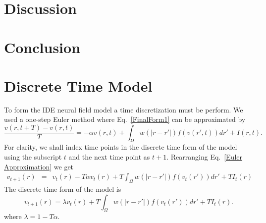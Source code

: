 \documentclass[onecolumn,draftcls]{IEEEtran}
\begin{document}
\section{Discussion}

\section{Conclusion}

\appendices

\section{Discrete Time Model}\label{Time Discretization}
To form the IDE neural field model a time discretization must be perform. We used a one-step Euler method where Eq.~\ref{FinalForm1} can be approximated by
\begin{equation}\label{Euler Approximation}	
\frac{v\left( r,t+T \right) - v\left( r,t\right)}{T} =   -\alpha v\left( r,t \right) + \int_\Omega  {w\left( |r-r'| \right)f\left( {v\left( r',t \right)} \right)dr'} + I\left(r,t\right).
\end{equation}
For clarity, we shall index time points in the discrete time form of the model using the subscript $t$ and the next time point as $t+1$. Rearranging Eq.~\ref{Euler Approximation} we get
\begin{eqnarray}\label{Euler Approximation}	
v_{t+1}\left( r\right) &=& v_t\left( r\right) -T \alpha v_t\left( r\right) + T \int_\Omega  {w\left( |r-r'| \right)f\left( {v_t\left( r'\right)} \right)dr'} + T I_t\left(r\right)
\end{eqnarray}
The discrete time form of the model is
\begin{equation}\label{Discrete Time Model1}
	v_{t+1}\left(r\right) = \lambda v_t\left(r\right) + T \int_\Omega { w\left(|r-r'|\right) f\left(v_t\left(r'\right)\right) dr'} + T I_t\left(r\right).
\end{equation}
where $\lambda = 1 - T \alpha$.
\end{document}
